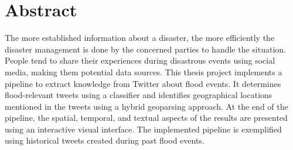 \section*{Abstract}

The more established information about a disaster, the more efficiently the disaster management is
done by the concerned parties to handle the situation. People tend to share their experiences during
disastrous events using social media, making them potential data sources. This thesis project
implements a pipeline to extract knowledge from Twitter about flood events. It determines
flood-relevant tweets using a classifier and identifies geographical locations mentioned in the
tweets using a hybrid geoparsing approach. At the end of the pipeline, the spatial, temporal, and
textual aspects of the results are presented using an interactive visual interface. The implemented
pipeline is exemplified using historical tweets created during past flood events.

